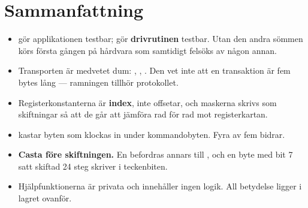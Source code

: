 \section*{Sammanfattning}

\begin{itemize}
  \item {} gör applikationen testbar;  gör \textbf{drivrutinen}
    testbar. Utan den andra sömmen körs  första gången på hårdvara som samtidigt
    felsöks av någon annan.
  \item Transporten är medvetet dum: , , . Den vet
    inte att en transaktion är fem bytes lång --- ramningen tillhör protokollet.
  \item Registerkonstanterna är \textbf{index}, inte offsetar, och maskerna skrivs som skiftningar
    så att de går att jämföra rad för rad mot registerkartan.
  \item {} kastar byten som klockas in under kommandobyten. Fyra av fem bidrar.
  \item \textbf{Casta före skiftningen.} En  befordras annars till ,
    och en byte med bit 7 satt skiftad 24 steg skriver i teckenbiten.
  \item Hjälpfunktionerna är privata och innehåller ingen logik. All betydelse ligger i lagret
    ovanför.
\end{itemize}

